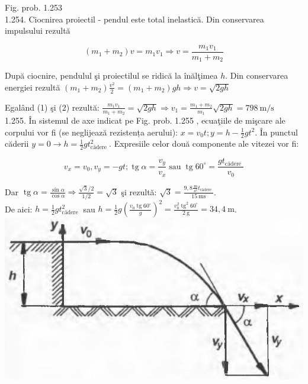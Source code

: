 \documentclass[10pt]{article}
\begin{document}
Fig. prob. 1.253\\
1.254. Ciocnirea proiectil - pendul este total inelastică. Din conservarea impulsului rezultă


\begin{equation*}
\left(m_{1}+m_{2}\right) v=m_{1} v_{1} \Rightarrow v=\frac{m_{1} v_{1}}{m_{1}+m_{2}} \tag{1}
\end{equation*}


După ciocnire, pendulul şi proiectilul se ridică la înălţimea $h$. Din conservarea energiei rezultă $\left(m_{1}+m_{2}\right) \frac{v^{2}}{2}=\left(m_{1}+m_{2}\right) g h \Rightarrow v=\sqrt{2 g h}$

Egalând (1) şi (2) rezultă: $\frac{m_{1} v_{1}}{m_{1}+m_{2}}=\sqrt{2 g h} \Rightarrow v_{1}=\frac{m_{1}+m_{2}}{m_{1}} \sqrt{2 g h}=798 \mathrm{~m} / \mathrm{s}$\\
1.255. În sistemul de axe indicat pe Fig. prob. 1.255 , ecuaţiile de mişcare ale corpului vor fi (se neglijează rezistența aerului): $x=v_{0} t ; y=h-\frac{1}{2} g t^{2}$. În punctul căderii $y=0 \rightarrow h=\frac{1}{2} g t_{\text {cădere }}^{2}$. Expresiile celor două componente ale vitezei vor fi:

$$
v_{x}=v_{0}, v_{y}=-g t ; \operatorname{tg} \alpha=\frac{v_{y}}{v_{x}} \operatorname{sau} \operatorname{tg} 60^{\circ}=\frac{g t_{\text {cădere }}}{v_{0}}
$$

Dar $\operatorname{tg} \alpha=\frac{\sin \alpha}{\cos \alpha} \Rightarrow \frac{\sqrt{3} / 2}{1 / 2}=\sqrt{3}$ şi rezultă: $\sqrt{3}=\frac{9,8 \frac{\mathrm{~m}}{\mathrm{~s}^{2}} t_{\text {cădere }}}{15 \mathrm{~ms}}$.\\
De aici: $h=\frac{1}{2} g t_{\text {cădere }}^{2}$ sau $h=\frac{1}{2} g\left(\frac{v_{0} \operatorname{tg} 60^{\circ}}{g}\right)^{2}=\frac{v_{0}^{2} \operatorname{tg}^{2} 60^{\circ}}{2 \mathrm{~g}}=34,4 \mathrm{~m}$.\\
\includegraphics[max width=\textwidth, center]{2025_07_01_5b3ff9fa0d508c8e9f17g-253(2)}
\end{document}
